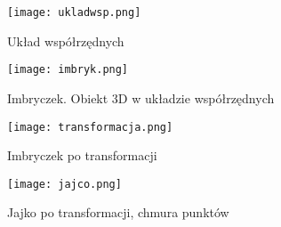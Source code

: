 \documentclass[a4paper,11pt]{article}
\begin{document}
    \begin{figure}[h!]
      \centering
      \texttt{[image: ukladwsp.png]}
      \caption{Układ współrzędnych}
      \label{fig:zrzut1}
    \end{figure}

    \begin{figure}[h!]
      \centering
      \texttt{[image: imbryk.png]}
      \caption{Imbryczek. Obiekt 3D w układzie współrzędnych}
      \label{fig:zrzut1}
    \end{figure}

    \begin{figure}[h!]
      \centering
      \texttt{[image: transformacja.png]}
      \caption{Imbryczek po transformacji}
      \label{fig:zrzut1}
    \end{figure}

    \begin{figure}[h!]
      \centering
      \texttt{[image: jajco.png]}
      \caption{Jajko po transformacji, chmura punktów}
      \label{fig:zrzut1}
    \end{figure}
\end{document}
